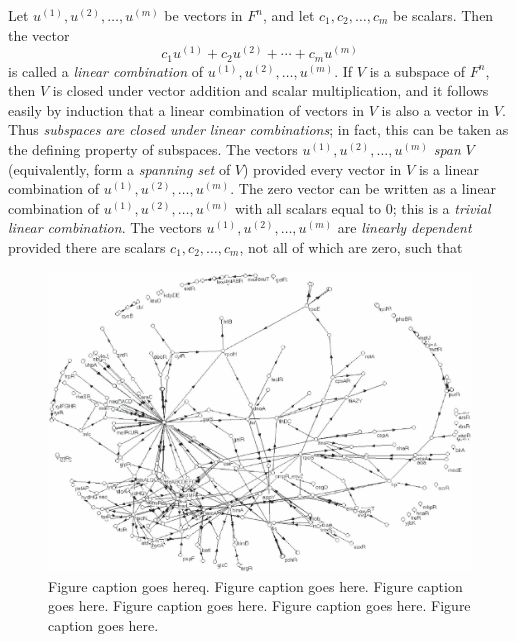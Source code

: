 \begin{definition}\label{1def:linearcomb}{\rm
Let $u^{(1)},u^{(2)},\ldots,u^{(m)}$ be vectors in $F^n$, and let 
$c_1,c_2,\ldots,c_m$ be scalars. Then the vector
\[c_1u^{(1)}+c_2u^{(2)}+\cdots+c_mu^{(m)}\]
is called a {\it linear combination}  of $u^{(1)},u^{(2)},\ldots,u^{(m)}$.
If $V$ is a subspace of $F^n$, then $V$ is closed under vector addition and 
scalar multiplication, and it follows easily by induction that a 
linear combination of vectors in $V$ is also a vector in $V$. Thus 
{\it subspaces 
are closed under linear combinations}; in fact, this can be taken as the 
defining property of subspaces.
The vectors $u^{(1)},u^{(2)},\ldots,u^{(m)}$ {\it span} $V$ 
(equivalently, form a {\it spanning set} of $V$) provided every vector in 
$V$ 
is a linear combination of $u^{(1)},u^{(2)},\ldots,u^{(m)}$. The zero 
vector can be written as a linear combination of 
$u^{(1)},u^{(2)},\ldots,u^{(m)}$ with all scalars equal to 0; this is a 
{\it trivial linear combination}. The vectors
$u^{(1)},u^{(2)},\ldots,u^{(m)}$ are {\it linearly dependent} provided 
there are scalars $c_1,c_2,\ldots,c_m$, not all of which are zero, such 
that

\begin{figure}[t!]
\centering
\includegraphics[width=\totalwidth]{chapters/my-chapter/figures/002x003.eps}
\caption[Short figure caption]{Figure caption goes hereq. Figure caption goes here.
Figure caption goes here. Figure caption goes here. Figure caption goes here.
Figure caption goes here.}
\end{figure}



}
\end{definition}
